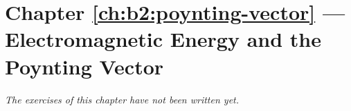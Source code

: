 \section*{Chapter \ref{ch:b2:poynting-vector} --- Electromagnetic Energy and the Poynting Vector}


\emph{The exercises of this chapter have not been written yet.}
